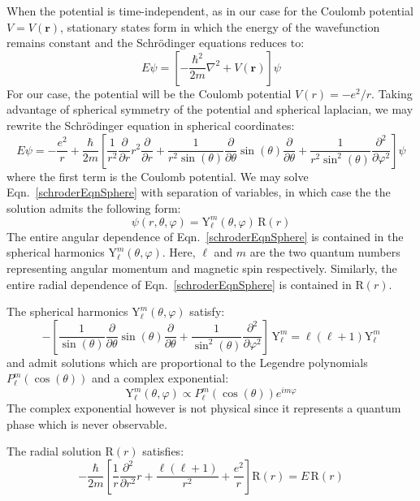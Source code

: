 \documentclass[12pt]{article}
\renewcommand{\vec}[1]{\mathbf{#1}} %
\newcommand{\ppd}[1]{\frac{\partial}{\partial#1}}
\newcommand{\ppsd}[1]{\frac{\partial^2}{\partial #1^2}}
\newcommand{\lap}{\nabla^2}
\let\originaleqref=\eqref
\renewcommand{\eqref}{Eqn.\ \originaleqref}
\begin{document}
When the potential is time-independent, as in our case for the Coulomb potential $V = V(\vec{r})$, stationary states form in which the energy of the wavefunction remains constant and the Schr\"odinger equations reduces to:
\begin{equation}
\label{schrodingerEqn2}
	E \psi = \left[-\frac{\hbar^2}{2m}\lap + V(\vec{r})\right] \psi
\end{equation}
For our case, the potential will be the Coulomb potential $V(r) = -e^2/r$. Taking advantage of spherical symmetry of the potential and spherical laplacian, we may rewrite the Schr\"odinger equation in spherical coordinates:
\begin{equation}
\label{schroderEqnSphere}
	E \psi = -\frac{e^2}{r} + \frac{\hbar}{2m} \left[ \frac{1}{r^2} \ppd{r}r^2 \ppd{r} + \frac{1}{r^2\sin(\theta)}\ppd{\theta}\sin(\theta)\ppd{\theta} + \frac{1}{r^2\sin^2(\theta)} \ppsd{\varphi} \right] \psi 
\end{equation}
where the first term is the Coulomb potential. We may solve \eqref{schroderEqnSphere} with separation of variables, in which case the the solution admits the following form:
\begin{equation}
	\psi(r,\theta,\varphi) = \mathrm{Y}_\ell^m(\theta,\varphi) \, \mathrm{R}(r)
\end{equation}
The entire angular dependence of \eqref{schroderEqnSphere} is contained in the spherical harmonics $\mathrm{Y}_\ell^m(\theta,\varphi)$. Here, $\ell$ and $m$ are the two quantum numbers representing angular momentum and magnetic spin respectively. Similarly, the entire radial dependence of \eqref{schroderEqnSphere} is contained in $\mathrm{R}(r)$.

The spherical harmonics $\mathrm{Y}_\ell^m(\theta,\varphi)$ satisfy:
\begin{equation}
\label{sphericalHarmonic}
	-\left[ \frac{1}{\sin(\theta)}\ppd{\theta}\sin(\theta)\ppd{\theta} + \frac{1}{\sin^2(\theta)} \ppsd{\varphi} \right] \, \mathrm{Y}_\ell^m = \ell(\ell+1)\mathrm{Y}_\ell^m
\end{equation}
and admit solutions which are proportional to the Legendre polynomials $P_\ell^m(\cos(\theta))$ and a complex exponential:
\begin{equation}
	\mathrm{Y}_\ell^m(\theta,\varphi) \propto P_\ell^m(\cos(\theta))e^{im\varphi}
\end{equation}
The complex exponential however is not physical since it represents a quantum phase which is never observable.

The radial solution $\mathrm{R}(r)$ satisfies:
\begin{equation}
\label{radialSoln}
	- \frac{\hbar}{2m} \left[ \frac{1}{r} \ppsd{r}r + \frac{\ell(\ell+1)}{r^2} + \frac{e^2}{r} \right] \mathrm{R}(r) = E \, \mathrm{R}(r)
\end{equation}
\end{document}
